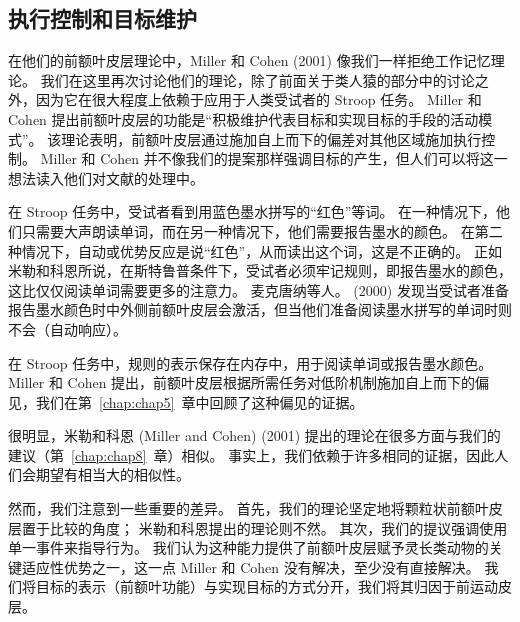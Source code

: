 \subsection{执行控制和目标维护}
在他们的前额叶皮层理论中，Miller 和 Cohen (2001) 像我们一样拒绝工作记忆理论。 我们在这里再次讨论他们的理论，除了前面关于类人猿的部分中的讨论之外，因为它在很大程度上依赖于应用于人类受试者的 Stroop 任务。 Miller 和 Cohen 提出前额叶皮层的功能是“积极维护代表目标和实现目标的手段的活动模式”。 该理论表明，前额叶皮层通过施加自上而下的偏差对其他区域施加执行控制。 Miller 和 Cohen 并不像我们的提案那样强调目标的产生，但人们可以将这一想法读入他们对文献的处理中。
\par 
在 Stroop 任务中，受试者看到用蓝色墨水拼写的“红色”等词。 在一种情况下，他们只需要大声朗读单词，而在另一种情况下，他们需要报告墨水的颜色。 在第二种情况下，自动或优势反应是说“红色”，从而读出这个词，这是不正确的。 正如米勒和科恩所说，在斯特鲁普条件下，受试者必须牢记规则，即报告墨水的颜色，这比仅仅阅读单词需要更多的注意力。 麦克唐纳等人。 (2000) 发现当受试者准备报告墨水颜色时中外侧前额叶皮层会激活，但当他们准备阅读墨水拼写的单词时则不会（自动响应）。
\par 
在 Stroop 任务中，规则的表示保存在内存中，用于阅读单词或报告墨水颜色。 Miller 和 Cohen 提出，前额叶皮层根据所需任务对低阶机制施加自上而下的偏见，我们在第~\ref{chap:chap5}~章中回顾了这种偏见的证据。
\par 
很明显，米勒和科恩 (Miller and Cohen) (2001) 提出的理论在很多方面与我们的建议（第~\ref{chap:chap8}~章）相似。 事实上，我们依赖于许多相同的证据，因此人们会期望有相当大的相似性。
\par 
然而，我们注意到一些重要的差异。 首先，我们的理论坚定地将颗粒状前额叶皮层置于比较的角度； 米勒和科恩提出的理论则不然。 其次，我们的提议强调使用单一事件来指导行为。 我们认为这种能力提供了前额叶皮层赋予灵长类动物的关键适应性优势之一，这一点 Miller 和 Cohen 没有解决，至少没有直接解决。 我们将目标的表示（前额叶功能）与实现目标的方式分开，我们将其归因于前运动皮层。
